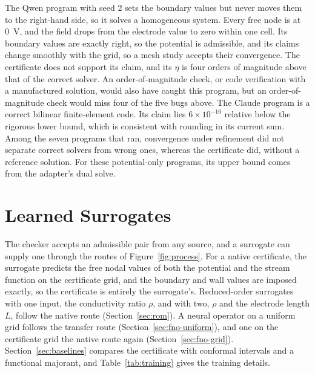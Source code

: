\documentclass[11pt]{article}
\begin{document}
The Qwen program with seed 2 sets the boundary values but never moves them to the
right-hand side, so it solves a homogeneous system. Every free node is at \SI{0}{V},
and the field drops from the electrode value to zero within one cell. Its boundary
values are exactly right, so the potential is admissible, and its claims change
smoothly with the grid, so a mesh study accepts their convergence. The certificate
does not support its claim, and its $\eta$ is four orders of magnitude above that of
the correct solver. An order-of-magnitude check, or code verification with a
manufactured solution, would also have caught this program, but an
order-of-magnitude check would miss four of the five bugs above. The Claude program
is a correct bilinear finite-element code. Its claim lies $6\times10^{-10}$ relative
below the rigorous lower bound, which is consistent with rounding in its current
sum. Among the seven programs that ran, convergence under refinement did not
separate correct solvers from wrong ones, whereas the certificate did, without a
reference solution. For these potential-only programs, its upper bound comes from
the adapter's dual solve.

\section{Learned Surrogates}\label{sec:e3}

The checker accepts an admissible pair from any source, and a surrogate can
supply one through the routes of Figure~\ref{fig:process}. For a native certificate,
the surrogate predicts the free nodal values of both the potential and the stream
function on the certificate grid, and the boundary and wall values are imposed
exactly, so the certificate is entirely the surrogate's. Reduced-order surrogates
with one input, the conductivity ratio $\rho$, and with two, $\rho$ and the electrode
length $L$, follow the native route (Section~\ref{sec:rom}).
A neural operator on a uniform grid follows the transfer route
(Section~\ref{sec:fno-uniform}), and one on the certificate grid the native route
again (Section~\ref{sec:fno-grid}). Section~\ref{sec:baselines} compares the
certificate with conformal intervals and a functional majorant, and
Table~\ref{tab:training} gives the training details.
\end{document}
